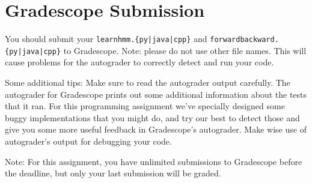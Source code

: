 \documentclass[11pt,addpoints,answers]{exam}
\begin{document}
\section{Gradescope Submission}

You should submit your \texttt{learnhmm.\{py|java|cpp\}} and %
\texttt{forwardbackward.\{py|java|cpp\}} to Gradescope.
Note: please do not use other file names. This will cause problems for the autograder to correctly detect and run your code.

Some additional tips: 
Make sure to read the autograder output carefully. The autograder for Gradescope prints out some additional 
information about the tests that it ran. For this programming assignment we've specially designed some buggy implementations that you might do, and try our best to detect those and give you some more useful feedback in Gradescope's autograder. Make wise use of autograder's output for debugging your code. 


Note: For this assignment, you have unlimited submissions to Gradescope before the deadline, but only your last submission will be graded.
   
    



\newpage
\end{document}
